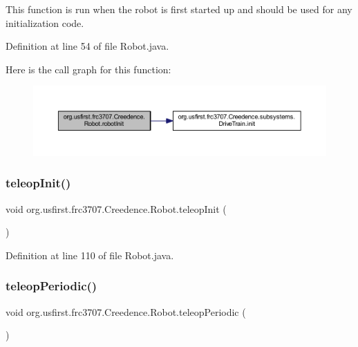 This function is run when the robot is first started up and should be used for any initialization code. 

Definition at line 54 of file Robot.\+java.

Here is the call graph for this function\+:
\nopagebreak
\begin{figure}[H]
\begin{center}
\leavevmode
\includegraphics[width=350pt]{classorg_1_1usfirst_1_1frc3707_1_1_creedence_1_1_robot_a7307806783815b6f22926b44074349c5_cgraph}
\end{center}
\end{figure}
\mbox{\label{classorg_1_1usfirst_1_1frc3707_1_1_creedence_1_1_robot_ae1b533c6c6269024575e20d8bdd102a9}} 
\subsubsection{\texorpdfstring{teleopInit()}{teleopInit()}}
{\footnotesize\ttfamily void org.\+usfirst.\+frc3707.\+Creedence.\+Robot.\+teleop\+Init (\begin{DoxyParamCaption}{ }\end{DoxyParamCaption})}



Definition at line 110 of file Robot.\+java.

\mbox{\label{classorg_1_1usfirst_1_1frc3707_1_1_creedence_1_1_robot_a2f85c1350a8f3b47911d519914d91b21}} 
\subsubsection{\texorpdfstring{teleopPeriodic()}{teleopPeriodic()}}
{\footnotesize\ttfamily void org.\+usfirst.\+frc3707.\+Creedence.\+Robot.\+teleop\+Periodic (\begin{DoxyParamCaption}{ }\end{DoxyParamCaption})}

